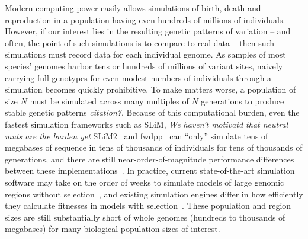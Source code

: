 \documentclass{article}
\newcommand{\jda}[1]{{\em \color{cyan} #1}}
\begin{document}
Modern computing power easily allows simulations of birth, death and reproduction
in a population having even hundreds of millions of individuals.
However, if our interest lies in the resulting genetic patterns of variation
-- and often, the point of such simulations is to compare to real data --
then such simulations must record data for each individual genome.
As samples of most species' genomes harbor tens or hundreds of millions of variant sites,
naively carrying full genotypes for even modest numbers of individuals through a simulation
becomes quickly prohibitive.
To make matters worse,
a population of size $N$ must be simulated across many multiples of $N$ generations
to produce stable genetic patterns \jda {citation?}.
Because of this computational burden, even the fastest simulation frameworks such as SLiM,
\jda{We haven't motivatd that neutral muts are the burden yet}
SLiM2~\citep{haller2017flexible} and fwdpp~\citep{fwdpp}
can ``only'' simulate tens of megabases of sequence in tens of thousands of individuals
for tens of thousands of generations, and there are still near-order-of-magnitude performance differences between these
implementations~\citep{haller2017flexible}.
In practice, current state-of-the-art simulation software may take on the order of
weeks to simulate models of large genomic regions without selection~\citep{fwdpp,Hernandez2015-wf},
and existing simulation engines differ in how efficiently they
calculate fitnesses in models with selection~\citep{fwdpp}.
These population and region sizes are still substantially short of whole genomes
(hundreds to thousands of megabases)
for many biological population sizes of interest.
\end{document}
